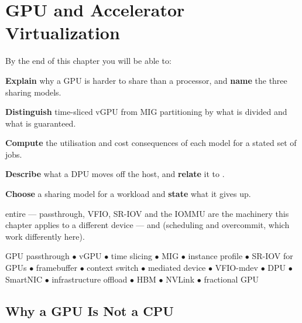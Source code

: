 \chapter{GPU and Accelerator Virtualization}\label{ch:gpu}

\begin{outcomes}
By the end of this chapter you will be able to:
\begin{tight}
  \item \textbf{Explain} why a GPU is harder to share than a processor, and
        \textbf{name} the three sharing models.
  \item \textbf{Distinguish} time-sliced vGPU from MIG partitioning by what is
        divided and what is guaranteed.
  \item \textbf{Compute} the utilisation and cost consequences of each model
        for a stated set of jobs.
  \item \textbf{Describe} what a DPU moves off the host, and \textbf{relate} it
        to .
  \item \textbf{Choose} a sharing model for a workload and \textbf{state} what
        it gives up.
\end{tight}
\end{outcomes}

\begin{prereq}
 entire --- passthrough, VFIO, SR-IOV and the IOMMU are the
machinery this chapter applies to a different device --- and 
(scheduling and overcommit, which work differently here).
\end{prereq}

\begin{keyterms}
GPU passthrough $\bullet$ vGPU $\bullet$ time slicing $\bullet$ MIG $\bullet$
instance profile $\bullet$ SR-IOV for GPUs $\bullet$ framebuffer $\bullet$
context switch $\bullet$ mediated device $\bullet$ VFIO-mdev $\bullet$ DPU
$\bullet$ SmartNIC $\bullet$ infrastructure offload $\bullet$ HBM $\bullet$
NVLink $\bullet$ fractional GPU
\end{keyterms}

\section{Why a GPU Is Not a CPU}

